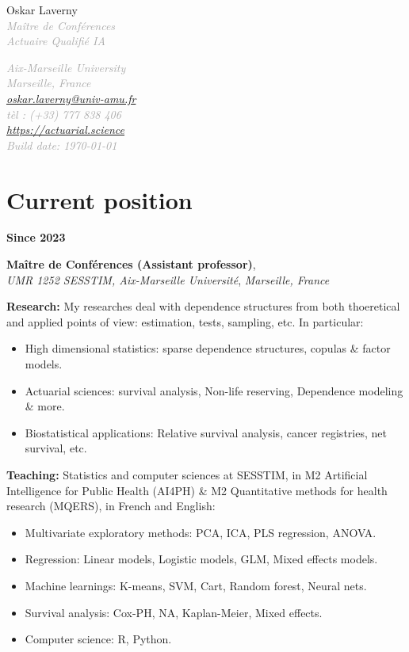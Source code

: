 \documentclass[a4paper,11pt]{article}
\newcommand{\tabcv}[2]{
\begin{minipage}[t]{0.12\linewidth}
\textbf{\footnotesize #1}
\end{minipage}\hfill
\begin{minipage}[t]{0.85\linewidth}
#2
\end{minipage}
\vspace{1em}
}
\newcommand*{\namestyle}[1]{{\fontsize{28}{30}\mdseries\upshape#1}}
\newcommand*{\titlestyle}[1]{{\LARGE\mdseries\slshape\textcolor{DarkGrey}{#1}}}
\newcommand*{\addressstyle}[1]{{\small\mdseries\slshape\textcolor{DarkGrey}{#1}}}
\newcommand{\bull}[1]{\textbf{#1}}
\begin{document}
\begin{multicols}{2}\raggedright
\namestyle{Oskar Laverny} \\
\vspace{0.5cm}
\titlestyle{Maître de Conférences}\\
\vspace{0.2cm}
\titlestyle{Actuaire Qualifié IA}
\columnbreak

\raggedleft
\addressstyle{
Aix-Marseille University\\
Marseille, France\\
\url{oskar.laverny@univ-amu.fr}\\
tèl : (+33) 777 838 406\\
\url{https://actuarial.science}\\
Build date: \today
}
\end{multicols}
\vspace{0.2cm}

\section{Current position}\label{subsec:act_pro_actuelle}

\tabcv{Since 2023}{
\textbf{Maître de Conférences (Assistant professor)},\\
\textit{UMR 1252 SESSTIM, Aix-Marseille Université}, \textit{Marseille, France} \\[0.5em]
{\footnotesize
  \bull{Research:} My researches deal with dependence structures from both thoeretical and applied points of view: estimation, tests, sampling, etc. In particular: 
  \begin{itemize}
    \item High dimensional statistics: sparse dependence structures, copulas \& factor models.
    \item Actuarial sciences: survival analysis, Non-life reserving, Dependence modeling \& more.
    \item Biostatistical applications: Relative survival analysis, cancer registries, net survival, etc.
  \end{itemize}
  \bull{Teaching:} Statistics and computer sciences at SESSTIM, in M2 Artificial Intelligence for Public Health (AI4PH)  \& M2 Quantitative methods for health research (MQERS), in French and English:
  \begin{itemize}
    \item Multivariate exploratory methods: PCA, ICA, PLS regression, ANOVA.
    \item Regression: Linear models, Logistic models, GLM, Mixed effects models.
    \item Machine learnings: K-means, SVM, Cart, Random forest, Neural nets. 
    \item Survival analysis: Cox-PH, NA, Kaplan-Meier, Mixed effects.
    \item Computer science: R, Python.
  \end{itemize}
}
}
\end{document}
